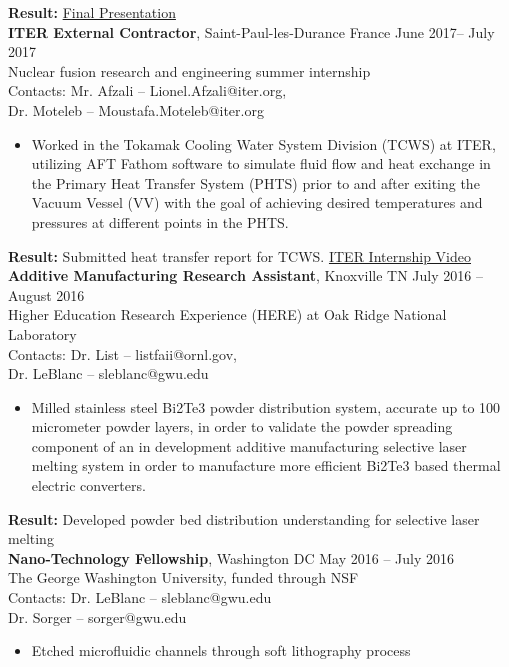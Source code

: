 \begin{singlespace}
\begin{itemize}
\end{itemize}
\textbf{Result:} \href{https://www.youtube.com/watch?v=Q8VchT2CjtY&t=1s}{Final Presentation}\\
\textbf{ITER External Contractor}, Saint-Paul-les-Durance France \hfill June 2017-- July 2017\\
Nuclear fusion research and engineering summer internship\\
Contacts: Mr. Afzali – Lionel.Afzali@iter.org,\\
Dr. Moteleb – Moustafa.Moteleb@iter.org
\begin{itemize}
	\item Worked in the Tokamak Cooling Water System Division (TCWS) at ITER, utilizing AFT Fathom software to simulate fluid flow and heat exchange in the Primary Heat Transfer System (PHTS) prior to and after exiting the Vacuum Vessel (VV) with the goal of achieving desired temperatures and pressures at different points in the PHTS.  
\end{itemize}
\textbf{Result:} Submitted heat transfer report for TCWS. \href{https://www.youtube.com/watch?v=YTAHgalWx-k}{ITER Internship Video}\\
\textbf{Additive Manufacturing Research Assistant}, Knoxville TN \hfill	July 2016 – August 2016\\  
Higher Education Research Experience (HERE) at Oak Ridge National Laboratory\\
Contacts: Dr. List – listfaii@ornl.gov,\\ 
Dr. LeBlanc – sleblanc@gwu.edu
\begin{itemize}
	\item Milled stainless steel Bi2Te3 powder distribution system, accurate up to 100 micrometer powder layers, in order to validate the powder spreading component of an in development additive manufacturing selective laser melting system in order to manufacture more efficient Bi2Te3 based thermal electric converters.
\end{itemize}
\textbf{Result: }Developed powder bed distribution understanding for selective laser melting\\
\textbf{Nano-Technology Fellowship}, Washington DC \hfill May 2016 – July 2016\\
The George Washington University, funded through NSF\\
Contacts: Dr. LeBlanc – sleblanc@gwu.edu\\
Dr. Sorger – sorger@gwu.edu
\begin{itemize}
	\item Etched microfluidic channels through soft lithography process

\end{itemize}
\end{singlespace}
